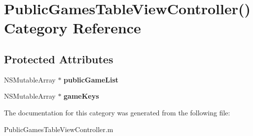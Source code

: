 \hypertarget{category_public_games_table_view_controller_07_08}{\section{Public\+Games\+Table\+View\+Controller() Category Reference}
\label{category_public_games_table_view_controller_07_08}
}
\subsection*{Protected Attributes}
\begin{DoxyCompactItemize}
\item 
\hypertarget{category_public_games_table_view_controller_07_08_aa5958c6036bca3e302b3fb8ab70ff5da}{N\+S\+Mutable\+Array $\ast$ {\bfseries public\+Game\+List}}\label{category_public_games_table_view_controller_07_08_aa5958c6036bca3e302b3fb8ab70ff5da}

\item 
\hypertarget{category_public_games_table_view_controller_07_08_a8eba01c509bf89f0eb62f6ffcd0142b1}{N\+S\+Mutable\+Array $\ast$ {\bfseries game\+Keys}}\label{category_public_games_table_view_controller_07_08_a8eba01c509bf89f0eb62f6ffcd0142b1}

\end{DoxyCompactItemize}


The documentation for this category was generated from the following file\+:\begin{DoxyCompactItemize}
\item 
Public\+Games\+Table\+View\+Controller.\+m\end{DoxyCompactItemize}
